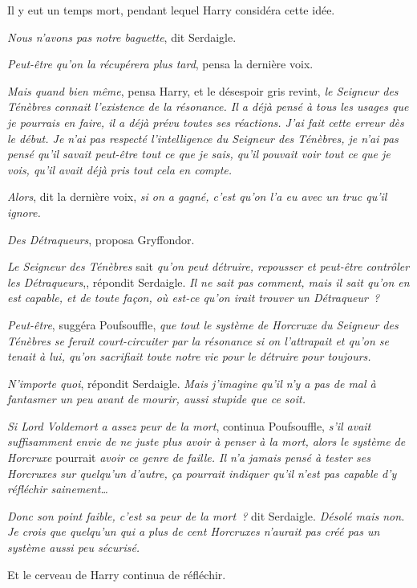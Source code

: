 Il y eut un temps mort, pendant lequel Harry considéra cette idée.

\emph{Nous n'avons pas notre baguette}, dit Serdaigle.

\emph{Peut-être qu'on la récupérera plus tard}, pensa la dernière voix.

\emph{Mais quand bien même}, pensa Harry, et le désespoir gris revint, \emph{le Seigneur des Ténèbres connait l'existence de la résonance. Il a déjà pensé à tous les usages que je pourrais en faire, il a déjà prévu toutes ses réactions. J'ai fait cette erreur dès le début. Je n'ai pas respecté l'intelligence du Seigneur des Ténèbres, je n'ai pas pensé qu'il savait peut-être tout ce que je sais, qu'il pouvait voir tout ce que je vois, qu'il avait déjà pris tout cela en compte.}

\emph{Alors}, dit la dernière voix, \emph{si on a gagné, c'est qu'on l'a eu avec un truc qu'il ignore.}

\emph{Des Détraqueurs}, proposa Gryffondor.

\emph{Le Seigneur des Ténèbres} sait \emph{qu'on peut détruire, repousser et peut-être contrôler les Détraqueurs},, répondit Serdaigle. \emph{Il ne sait pas comment, mais il sait qu'on en est capable, et de toute façon, où est-ce qu'on irait trouver un Détraqueur~?}

\emph{Peut-être}, suggéra Poufsouffle, \emph{que tout le système de Horcruxe du Seigneur des Ténèbres se ferait court-circuiter par la résonance si on l'attrapait et qu'on se tenait à lui, qu'on sacrifiait toute notre vie pour le détruire pour toujours.}

\emph{N'importe quoi}, répondit Serdaigle. \emph{Mais j'imagine qu'il n'y a pas de mal à fantasmer un peu avant de mourir, aussi stupide que ce soit.}

\emph{Si Lord Voldemort a assez peur de la mort}, continua Poufsouffle, \emph{s'il avait suffisamment envie de ne juste plus avoir à penser à la mort, alors le système de Horcruxe} pourrait \emph{avoir ce genre de faille. Il n'a jamais pensé à tester ses Horcruxes sur quelqu'un d'autre, ça pourrait indiquer qu'il n'est pas capable d'y réfléchir sainement…}

\emph{Donc son point faible, c'est sa peur de la mort~?} dit Serdaigle. \emph{Désolé mais non. Je crois que quelqu'un qui a plus de cent Horcruxes n'aurait pas créé pas un système aussi peu sécurisé.}

Et le cerveau de Harry continua de réfléchir.


